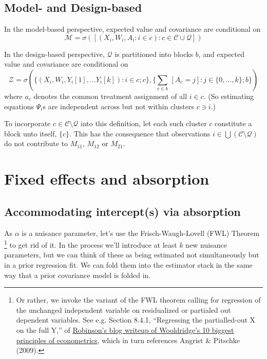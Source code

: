 \documentclass{article}
\begin{document}
\subsection{Model- and Design-based}\label{sec:des-vs-mod-based}

In the model-based perspective, expected value and covariance are
conditional on
\[ \mathcal{M} = \sigma\left(\left[(X_{i}, W_{i}, A_{i}: i \in c): c \in
      \mathcal{C}\cup \mathcal{Q} \right]\right)\]


In the design-based perspective, $\mathcal{Q}$ is partitioned into
blocks $b$, and expected value and covariance are
conditional on
\[\mathcal{Z} = \sigma(\{(X_{i}, W_{i}, Y_{i}[1], \ldots Y_{i}[k]):
  i \in c; c\}, \{\sum_{c
    \in b}\, \![A_{c}=j\!] : j \in \{0, \ldots, k\}; b\} )\]
where $a_{c}$ denotes the common treatment assignment of all $i\in
c$. (So estimating equations ${\Psi}_{i}$s are independent across but not within
clusters $c \ni i$.)

To incorporate $c\in \mathcal{C}\setminus\mathcal{Q}$ into this
definition, let each such cluster $c$ constitute a block unto itself,
$\{c\}$. This has the consequence that observations $i
\in \bigcup\left(\mathcal{C}\setminus\mathcal{Q}\right)$ do not
contribute to $M_{11}$, $M_{12}$ or $M_{21}$.

\section{Fixed effects and absorption}
\subsection{Accommodating intercept(s) via absorption}\label{sec:accomm-interc-via}
As $\alpha$ is a nuisance parameter, let's use the
Frisch-Waugh-Lovell (FWL) Theorem%
\footnote{Or rather, we invoke the variant of the FWL theorem calling
  for regression of the unchanged independent variable on residualized
or partialed out dependent variables.  See e.g. Section 8.4.1,
``Regressing the partialled-out X on the full Y,'' of
\href{https://bookdown.org/ts_robinson1994/10_fundamental_theorems_for_econometrics/frisch.html}{Robinson's
  blog writeup of Wooldridge's 10 biggest principles of econometrics},
which in turn references Angrist \& Pitschke (2009).} to get rid of it.  In the process we'll
introduce at least $k$ new nuisance parameters, but we can think of these as
being estimated not simultaneously but in a prior regression fit.
We can fold them into the estimator stack in the same way that a prior
covariance model is folded in.
\end{document}
